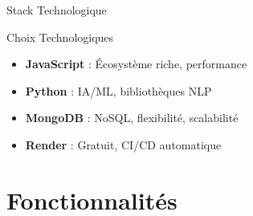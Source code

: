 \documentclass[aspectratio=169]{beamer}
\begin{document}
\begin{frame}{Stack Technologique}
    \begin{exampleblock}{Choix Technologiques}
        \begin{itemize}
            \item \textbf{JavaScript} : Écosystème riche, performance
            \item \textbf{Python} : IA/ML, bibliothèques NLP
            \item \textbf{MongoDB} : NoSQL, flexibilité, scalabilité
            \item \textbf{Render} : Gratuit, CI/CD automatique
        \end{itemize}
    \end{exampleblock}
\end{frame}

\section{Fonctionnalités}
\end{document}
